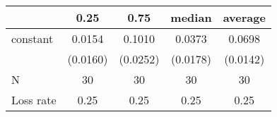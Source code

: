 \begin{tabular}{lcccc}
\hline
          &   0.25   &   0.75   &  median  & average   \\
\midrule
\midrule
constant  & 0.0154   & 0.1010   & 0.0373   & 0.0698    \\
          & (0.0160) & (0.0252) & (0.0178) & (0.0142)  \\
N         & 30       & 30       & 30       & 30        \\
Loss rate & 0.25     & 0.25     & 0.25     & 0.25      \\
\hline
\end{tabular}